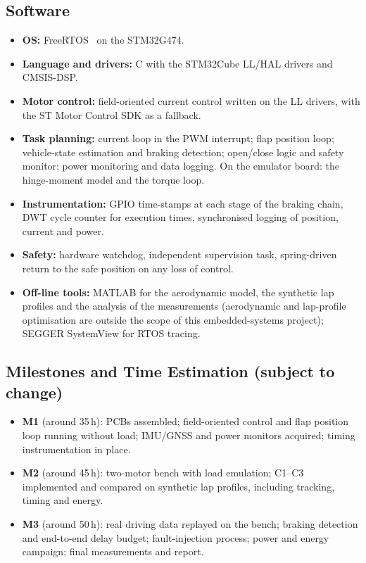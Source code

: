 \documentclass[11pt,a4paper]{article}
\begin{document}
\subsection{Software}
\begin{itemize}
  \item \textbf{OS:} FreeRTOS~\cite{freertos} on the STM32G474.
  \item \textbf{Language and drivers:} C with the STM32Cube LL/HAL drivers and CMSIS-DSP.
  \item \textbf{Motor control:} field-oriented current control written on the LL drivers, with the ST Motor Control SDK as a fallback.
  \item \textbf{Task planning:} current loop in the PWM interrupt; flap position loop; vehicle-state estimation and braking detection; open/close logic and safety monitor; power monitoring and data logging. On the emulator board: the hinge-moment model and the torque loop.
  \item \textbf{Instrumentation:} GPIO time-stamps at each stage of the braking chain, DWT cycle counter for execution times, synchronised logging of position, current and power.
  \item \textbf{Safety:} hardware watchdog, independent supervision task, spring-driven return to the safe position on any loss of control.
  \item \textbf{Off-line tools:} MATLAB for the aerodynamic model, the synthetic lap profiles and the analysis of the measurements (aerodynamic and lap-profile optimisation are outside the scope of this embedded-systems project); SEGGER SystemView for RTOS tracing.
\end{itemize}

\subsection{Milestones and Time Estimation (subject to change)}
\begin{itemize}
  \item \textbf{M1} (around 35\,h): PCBs assembled; field-oriented control and flap position loop running without load; IMU/GNSS and power monitors acquired; timing instrumentation in place.
  \item \textbf{M2} (around 45\,h): two-motor bench with load emulation; C1--C3 implemented and compared on synthetic lap profiles, including tracking, timing and energy.
  \item \textbf{M3} (around 50\,h): real driving data replayed on the bench; braking detection and end-to-end delay budget; fault-injection process; power and energy campaign; final measurements and report.
\end{itemize}
\end{document}
